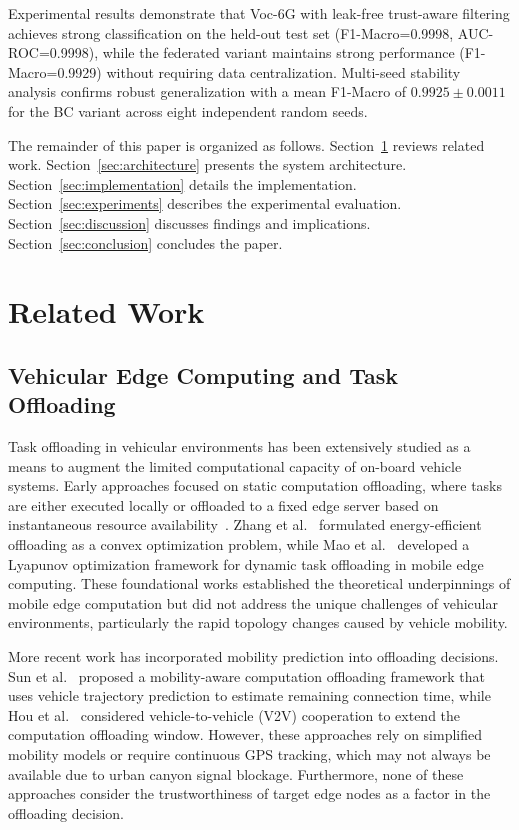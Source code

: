 \documentclass[journal,twoside]{IEEEtran}
\newcommand{\VocSixG}{Voc-6G}
\begin{document}
Experimental results demonstrate that \VocSixG{} with leak-free trust-aware filtering achieves strong classification on the held-out test set (F1-Macro=0.9998, AUC-ROC=0.9998), while the federated variant maintains strong performance (F1-Macro=0.9929) without requiring data centralization. Multi-seed stability analysis confirms robust generalization with a mean F1-Macro of $0.9925 \pm 0.0011$ for the BC variant across eight independent random seeds.

The remainder of this paper is organized as follows. Section~\ref{sec:related} reviews related work. Section~\ref{sec:architecture} presents the system architecture. Section~\ref{sec:implementation} details the implementation. Section~\ref{sec:experiments} describes the experimental evaluation. Section~\ref{sec:discussion} discusses findings and implications. Section~\ref{sec:conclusion} concludes the paper.


\section{Related Work}
\label{sec:related}

\subsection{Vehicular Edge Computing and Task Offloading}

Task offloading in vehicular environments has been extensively studied as a means to augment the limited computational capacity of on-board vehicle systems. Early approaches focused on static computation offloading, where tasks are either executed locally or offloaded to a fixed edge server based on instantaneous resource availability~\cite{chen2019computation, mao2017mobile}. Zhang et al.~\cite{zhang2015energy} formulated energy-efficient offloading as a convex optimization problem, while Mao et al.~\cite{mao2017mobile} developed a Lyapunov optimization framework for dynamic task offloading in mobile edge computing. These foundational works established the theoretical underpinnings of mobile edge computation but did not address the unique challenges of vehicular environments, particularly the rapid topology changes caused by vehicle mobility.

More recent work has incorporated mobility prediction into offloading decisions. Sun et al.~\cite{sun2021toward} proposed a mobility-aware computation offloading framework that uses vehicle trajectory prediction to estimate remaining connection time, while Hou et al.~\cite{hou2018mobile} considered vehicle-to-vehicle (V2V) cooperation to extend the computation offloading window. However, these approaches rely on simplified mobility models or require continuous GPS tracking, which may not always be available due to urban canyon signal blockage. Furthermore, none of these approaches consider the trustworthiness of target edge nodes as a factor in the offloading decision.
\end{document}
